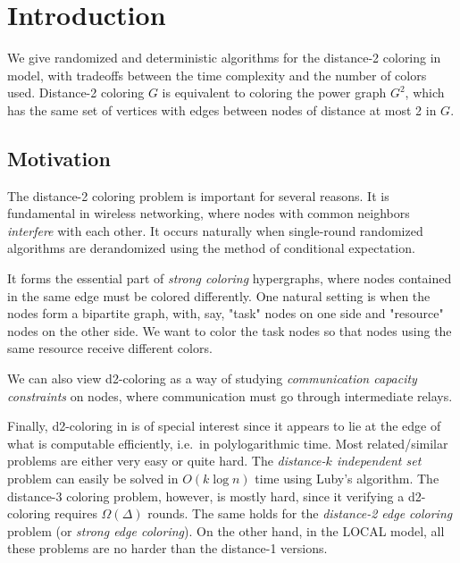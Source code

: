 \section{Introduction}

We give randomized and deterministic algorithms for the distance-2 coloring in {\congest} model, with tradeoffs between the time complexity and the number of colors used. 
Distance-2 coloring $G$ is equivalent to coloring the power graph $G^2$, which has the same set of vertices with edges between nodes of distance at most 2 in $G$.

\subsection*{Motivation} The distance-2 coloring  problem is important for several reasons. 
It is fundamental in wireless networking, where nodes with common neighbors \emph{interfere} with each other. It occurs naturally when single-round randomized algorithms are derandomized using the method of conditional expectation. 

It forms the essential part of \emph{strong coloring} hypergraphs, where nodes contained in the same edge must be colored differently. 
One natural setting is when the nodes form a bipartite graph, with, say, "task" nodes on one side and "resource" nodes on the other side. We want to color the task nodes so that nodes using the same resource receive different colors.

We can also view d2-coloring as a way of studying \emph{communication capacity constraints} on nodes, where communication must go through intermediate relays. 

Finally, d2-coloring in {\congest} is of special interest since it appears to lie at the edge of what is computable efficiently, i.e.\ in polylogarithmic time. Most related/similar problems are either very easy or quite hard. The \emph{distance-$k$ independent set} problem can easily be solved in $O(k\log n)$ time using Luby's algorithm. The distance-3 coloring problem, however, is mostly hard, since it verifying a d2-coloring requires $\Omega(\Delta)$ rounds. The same holds for the \emph{distance-2 edge coloring} problem (or \emph{strong edge coloring}). On the other hand, in the LOCAL model, all these problems are no harder than the distance-1 versions.




